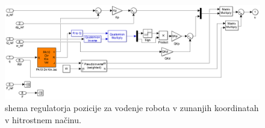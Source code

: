 \begin{figure}[!h]
	\centering
	\includegraphics[trim={0 0cm 0 0cm},scale=0.25]{./Slike/zunanje_koordinate_vel.png}
	\caption{\simulink shema regulatorja pozicije za vodenje robota v zunanjih koordinatah v hitrostnem na\v{c}inu.}
	\label{fig:zunanje_koordinate_vel}
\end{figure}
